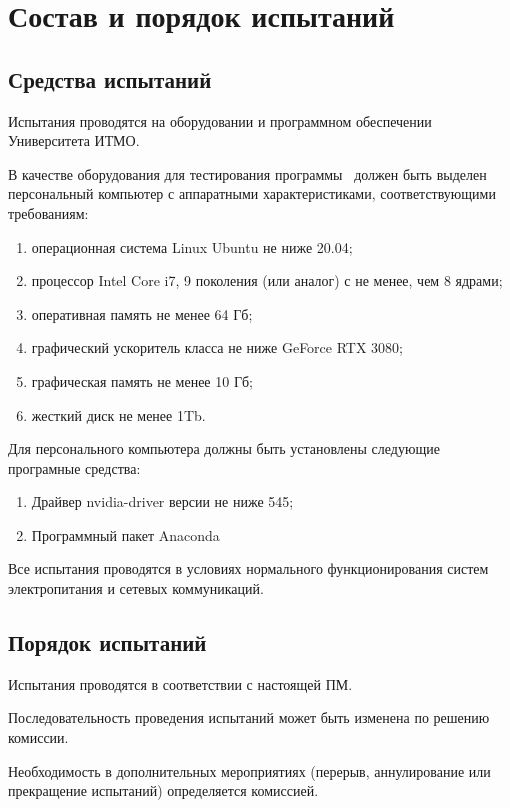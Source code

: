 \newpage
\section{Состав и порядок испытаний}

\subsection{Средства испытаний}

Испытания проводятся на оборудовании и программном обеспечении Университета ИТМО.

В качестве оборудования для тестирования программы \productname \ должен быть выделен персональный компьютер с аппаратными характеристиками, соответствующими требованиям:
\begin{enumerate}
    \item операционная система Linux Ubuntu не ниже 20.04;
    \item процессор Intel Core i7, 9 поколения (или аналог) с не менее, чем 8 ядрами;
    \item оперативная память не менее 64 Гб;
    \item графический ускоритель класса не ниже GeForce RTX 3080;
    \item графическая память не менее 10 Гб;
    \item жесткий диск не менее 1Tb.
\end{enumerate}

Для персонального компьютера должны быть установлены следующие програмные средства:
\begin{enumerate}
    \item Драйвер nvidia-driver версии не ниже 545;
    \item Программный пакет Anaconda
\end{enumerate}

Все испытания проводятся в условиях нормального функционирования систем электропитания и сетевых коммуникаций.


\subsection{Порядок испытаний}

Испытания проводятся в соответствии с настоящей ПМ.

Последовательность проведения испытаний может быть изменена по решению комиссии.

Необходимость в дополнительных мероприятиях (перерыв, аннулирование или прекращение испытаний) определяется комиссией.
